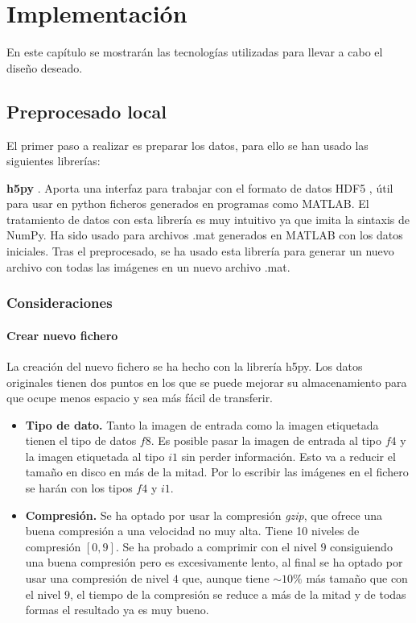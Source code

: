 \chapter{Implementación}\label{implementacion}

En este capítulo se mostrarán las tecnologías utilizadas para llevar a cabo el diseño deseado.

\section{Preprocesado local}\label{sec:local_preprocessing}

El primer paso a realizar es preparar los datos, para ello se han usado las siguientes librerías:

\textbf{h5py} \cite{Collette2013}. Aporta una interfaz para trabajar con el formato de datos HDF5 \cite{HDFGroup20002010}, útil para usar en python ficheros generados en programas como MATLAB. El tratamiento de datos con esta librería es muy intuitivo ya que imita la sintaxis de NumPy. Ha sido usado para archivos .mat generados en MATLAB con los datos iniciales. Tras el preprocesado, se ha usado esta librería para generar un nuevo archivo con todas las imágenes en un nuevo archivo .mat.

\subsection{Consideraciones}
\subsubsection{Crear nuevo fichero}

La creación del nuevo fichero se ha hecho con la librería h5py. Los datos originales tienen dos puntos en los que se puede mejorar su almacenamiento para que ocupe menos espacio y sea más fácil de transferir.
\begin{itemize}
\item \textbf{Tipo de dato.} Tanto la imagen de entrada como la imagen etiquetada tienen el tipo de datos $f8$. Es posible pasar la imagen de entrada al tipo $f4$ y la imagen etiquetada al tipo $i1$ sin perder información. Esto va a reducir el tamaño en disco en más de la mitad. Por lo escribir las imágenes en el fichero se harán con los tipos $f4$ y $i1$.
\item \textbf{Compresión.} Se ha optado por usar la compresión \textit{gzip}, que ofrece una buena compresión a una velocidad no muy alta. Tiene 10 niveles de compresión $[0,9]$. Se ha probado a comprimir con el nivel $9$ consiguiendo una buena compresión pero es excesivamente lento, al final se ha optado por usar una compresión de nivel $4$ que, aunque tiene $\sim 10\%$ más tamaño que con el nivel $9$, el tiempo de la compresión se reduce a más de la mitad y de todas formas el resultado ya es muy bueno.
\end{itemize}

